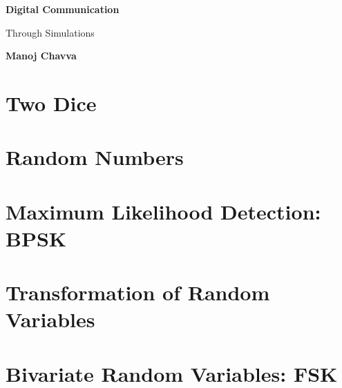 \documentclass[11pt]{book}
\begin{document}
\begin{titlepage}
\vspace*{\fill}
        \vspace*{1cm}
            
        \Huge
        \textbf{Digital Communication }
            
        \vspace{0.5cm}
        \LARGE
       Through Simulations
            
        \vspace{1.6cm}
        \textbf{Manoj Chavva}           
\vspace*{\fill}    
\end{titlepage}
\tableofcontents
\chapter{Two Dice}
\setcounter{page}{1}

\newpage
\chapter{Random Numbers}

\newpage
\chapter{Maximum Likelihood Detection: BPSK}

\newpage
\chapter{Transformation of Random Variables}

\newpage
\chapter{Bivariate Random Variables: FSK}

\end{document}
